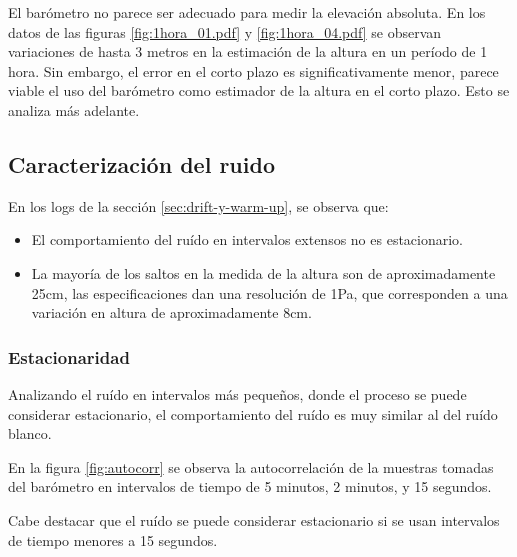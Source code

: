 \documentclass[spanish,12pt,a4paper,titlepage]{report}
\begin{document}
El barómetro no parece ser adecuado para medir la elevación absoluta. En los datos de las figuras \ref{fig:1hora_01.pdf} y \ref{fig:1hora_04.pdf} se observan variaciones de hasta 3 metros en la estimación de la altura en un período de 1 hora. Sin embargo, el error en el corto plazo es significativamente menor, parece viable el uso del barómetro como estimador de la altura en el corto plazo. Esto se analiza más adelante.

\newpage
\subsection{Caracterización del ruido}
\label{sec:caract-ruido}

En los logs de la sección \ref{sec:drift-y-warm-up}, se observa que:
\begin{itemize}
\item El comportamiento del ruído en intervalos extensos no es estacionario.
\item La mayoría de los saltos en la medida de la altura son de aproximadamente 25cm, las especificaciones dan una resolución de 1Pa, que corresponden a una variación en altura de aproximadamente 8cm.
\end{itemize}

\subsubsection{Estacionaridad}

Analizando el ruído en intervalos más pequeños, donde el proceso se puede considerar estacionario, el comportamiento del ruído es muy similar al del ruído blanco.

En la figura \ref{fig:autocorr} se observa la autocorrelación de la muestras tomadas del barómetro en intervalos de tiempo de 5 minutos, 2 minutos, y 15 segundos.

Cabe destacar que el ruído se puede considerar estacionario si se usan intervalos de tiempo menores a 15 segundos.
\end{document}
